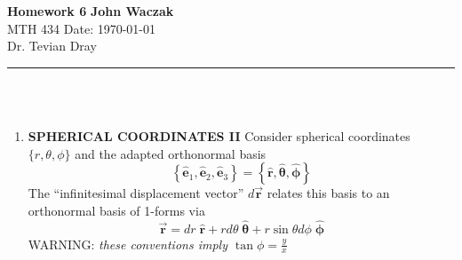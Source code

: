 \documentclass[a4paper, 11pt]{article}
\newcommand{\basis}[1]{\hat{\mathbf{e}}_#1}
\newcommand{\unit}[1]{\hat{\boldsymbol{#1}}}
\begin{document}
\noindent
\large\textbf{Homework 6} \hfill \textbf{John Waczak} \\
\normalsize MTH 434 \hfill  Date: \today \\
Dr. Tevian Dray %
\par\noindent\rule{\textwidth}{0.4pt} \\\\



\begin{enumerate}[leftmargin=0em, label=\textbf{\arabic*}]
\item \textbf{SPHERICAL COORDINATES II}
  Consider spherical coordinates $\{r, \theta, \phi\}$ and the adapted
  orthonormal basis
  \begin{equation}
    \left\{ \basis{1}, \basis{2}, \basis{3} \right\} = \left\{ \unit{r}, \unit{\theta}, \unit{\phi} \right\}
  \end{equation}
  The ``infinitesimal displacement vector'' $d\vec{\boldsymbol{r}}$ relates this
  basis to an orthonormal basis of 1-forms via
  \begin{equation}
    \vec{\boldsymbol{r}} = dr\;\unit{r} + rd\theta\;\unit{\theta} + r\sin\theta d\phi \;\unit{\phi}
  \end{equation}
  WARNING: \textit{these conventions imply $\tan\phi = \frac{y}{x}$}



\end{enumerate}
\end{document}

